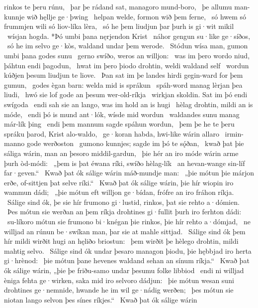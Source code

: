 rinkos te þeru rúnu, \hld\ þar þe rádand sat,
managoro mund-boro, \hld\ þe allumu man-kunnje
wið hęllje ge·þwing \hld\ helpan welde,
formon wið þem ferne, \hld\ só hwem só frummjen wili
só liov-líka lèra, \hld\ só he þem liudjun þar
þurh is gi·wit mikil \hld\ wísjan hogda.
*Þó umbi þana nęrjendon Krist \hld\ náhor gengun
su·like ge·síðos, \hld\ só he im selvo ge·kòs,
waldand undar þem werode. \hld\ Stódun wísa man,
gumon umbi þana godes sunu \hld\ gerno swíðo,
weros an willjon: \hld\ was im þero wordo niud,
þáhtun endi þagodun, \hld\ hwat im þero þiodo drohtin,
weldi waldand self \hld\ wordun kúðjen
þesum liudjun te liove. \hld\ Þan sat im þe landes hirdi
gegin-ward for þem gumun, \hld\ godes ègan barn:
welda mid is sprákun \hld\ spáh-word manag
lèrjan þea liudi, \hld\ hwó sie lof gode
an þesum wer-old-ríkja \hld\ wirkjan skoldin.
Sat im þó endi swígoda \hld\ endi sah sie an lango,
was im hold an is hugi \hld\ hèlag drohtin,
mildi an is móde, \hld\ endi þó is mund ant·lók,
wísde mid wordun \hld\ waldandes sunu
manag már-lík þing \hld\ endi þem mannum sagde
spáhun wordun, \hld\ þem þe he te þeru spráku þarod,
Krist alo-waldo, \hld\ ge·koran habda,
hwi-like wárin allaro \hld\ irmin-manno
gode werðoston \hld\ gumono kunnjes;
sagde im þó te sǫ́ðan, \hld\ kwað þat þie sáliga wárin,
man an þesoro middil-gardun, \hld\ þie hér an iro móde wárin
arme þurh òd-módi: \hld\ „þem is þat éwana ríki,
swíðo hèlag-lík \hld\ an hevan-wange
sin-líf far·geven.“ \hld\ Kwað þat ók sálige wárin
máð-mundje man: \hld\ „þie mótun þie márjon erðe,
of-sittjen þat selve ríki.“ \hld\ Kwað þat ók sálige wárin,
þie hír wiopin iro wammun dádi; \hld\ „þie mótun eft willjon ge·bídan,
frófre an iro fráhon ríkja. \hld\ Sálige sind ók, þe sie hír frumono gi·lustid,
rinkos, þat sie rehto a·dómien. \hld\ Þes mótun sie werðan an þem ríkja drohtines
gi·fullit þurh iro ferhton dádi: \hld\ su-líkoro mótun sie frumono bi·knégan
þie rinkos, þie hír rehto a·dómjad, \hld\ ne willjad an rúnun be·swíkan
man, þar sie at mahle sittjad. \hld\ Sálige sind ók þem hír mildi wirðit
hugi an hęliðo briostun: \hld\ þem wirðit þe hèlego drohtin,
mildi mahtig selvo. \hld\ Sálige sind ók undar þesaro managon þiodu,
þie hębbjad iro herta gi·hrènod: \hld\ þie mótun þane hevenes waldand
sehan an sínum ríkja.“ \hld\ Kwað þat ók sálige wárin,
„þie þe friðu-samo undar þesumu folke libbiod \hld\ endi ni willjad èniga fehta ge·wirken,
saka mid iro selvoro dádjun: \hld\ þie mótun wesan suni drohtines ge·nemnide,
hwande he im wil ge·nádig werðen; \hld\ þes mótun sie niotan lango
selvon þes sínes ríkjes.“ \hld\ Kwað þat ók sálige wárin
